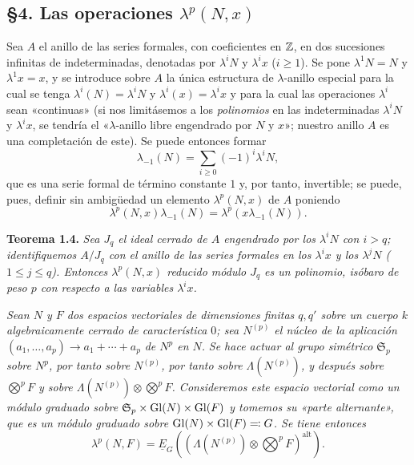 \subsection*{\S 4. Las operaciones $\lambda^p(N,x)$}

Sea $A$ el anillo de las series formales, con coeficientes en $\mathbb Z$, en dos sucesiones infinitas de indeterminadas, denotadas por $\lambda^iN$ y $\lambda^i x$ ($i\geq1$). Se pone $\lambda^1N=N$ y $\lambda^1x=x$, y se introduce sobre $A$ la única estructura de $\lambda$-anillo especial para la cual se tenga $\lambda^i(N)=\lambda^iN$ y $\lambda^i(x)=\lambda^ix$ y para la cual las operaciones $\lambda^i$ sean «continuas» (si nos limitásemos a los \emph{polinomios} en las indeterminadas $\lambda^iN$ y $\lambda^ix$, se tendría el «$\lambda$-anillo libre engendrado por $N$ y $x$»; nuestro anillo $A$ es una completación de este). Se puede entonces formar
\begin{equation}\tag{1.31}
\lambda_{-1}(N)=\sum_{i\geq0}(-1)^i\lambda^iN,
\end{equation}
que es una serie formal de término constante $1$ y, por tanto, invertible; se puede, pues, definir sin ambigüedad un elemento $\lambda^p(N,x)$ de $A$ poniendo
\begin{equation}\tag{1.32}
\lambda^p(N,x)\lambda_{-1}(N)=\lambda^p(x\lambda_{-1}(N)).
\end{equation}

\textbf{Teorema 1.4.} \emph{Sea $J_q$ el ideal cerrado de $A$ engendrado por los $\lambda^iN$ con $i>q$; identifiquemos $A/J_q$ con el anillo de las series formales en los $\lambda^i x$ y los $\lambda^jN$ ($1\leq j\leq q$). Entonces $\lambda^p(N,x)$ reducido módulo $J_q$ es un polinomio, isóbaro de peso $p$ con respecto a las variables $\lambda^i x$.}

\emph{Sean $N$ y $F$ dos espacios vectoriales de dimensiones finitas $q,q'$ sobre un cuerpo $k$ algebraicamente cerrado de característica $0$; sea $N^{(p)}$ el núcleo de la aplicación} $(a_1,\ldots,a_p)\longrightarrow a_1+\cdots+a_p$ \emph{de $N^p$ en $N$.} \emph{Se hace actuar al grupo simétrico $\mathfrak S_p$ sobre $N^p$, por tanto sobre $N^{(p)}$, por tanto sobre $\Lambda(N^{(p)})$, y después sobre $\bigotimes^p F$ y sobre $\Lambda(N^{(p)})\otimes\bigotimes^p F$. Consideremos este espacio vectorial como un módulo graduado sobre $\mathfrak S_p\times\operatorname{Gl}(N)\times\operatorname{Gl}(F)$ y tomemos su «parte alternante», que es un módulo graduado sobre $\operatorname{Gl}(N)\times\operatorname{Gl}(F)\eqqcolon G$. Se tiene entonces}
\begin{equation}\tag{1.33}
\lambda^p(N,F)=\underline{E}_G\left(\left(\Lambda(N^{(p)})\otimes\bigotimes^p F\right)^{\mathrm{alt}}\right).
\end{equation}

